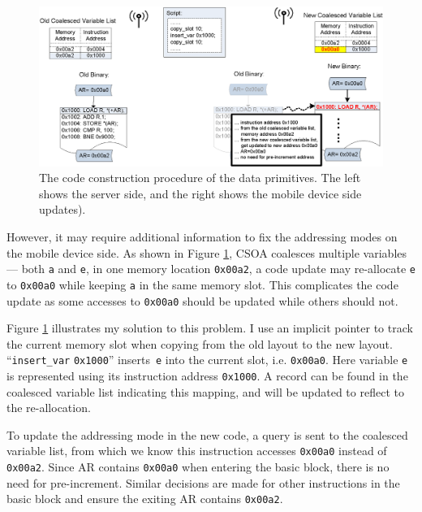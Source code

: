 \begin{figure}[htbp]
\begin{center}
\includegraphics[width=6in]{./figures/correct.eps}
\caption[The code construction procedure of the data primitives.]{The code construction procedure of the data primitives.
The left shows the server side, and the right shows the mobile device side updates).}
\label{codecorrection}
\end{center}
\end{figure}

However, it may require additional information to fix the addressing modes on the mobile device side. As shown in Figure \ref{codecorrection}, CSOA coalesces multiple variables --- both {\tt a} and {\tt e}, in one memory location {\tt 0x00a2}, a code update may re-allocate {\tt e} to {\tt 0x00a0} while keeping {\tt a} in the same memory slot. This complicates the code update as some accesses to {\tt 0x00a0} should be updated while others should not.

Figure \ref{codecorrection} illustrates my solution to this problem. 
I use an implicit pointer to track the current memory slot when copying from the old layout to the new layout.  ``{\tt insert\_var} {\tt 0x1000}'' inserts~{\tt e} into the current slot, i.e. {\tt 0x00a0}. Here variable {\tt e} is represented using its instruction address {\tt 0x1000}. A record can be found in the coalesced variable list indicating this mapping, and will be updated to reflect to the re-allocation.

To update the addressing mode in the new code, a query is sent to the coalesced variable list, from which we know this instruction accesses {\tt 0x00a0} instead of {\tt 0x00a2}. Since AR contains {\tt 0x00a0} when entering the basic block, there is no need for pre-increment. Similar decisions are made for other instructions in the basic block and ensure the exiting AR contains {\tt 0x00a2}.

